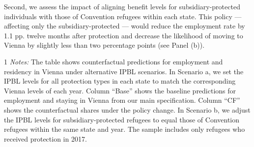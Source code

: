 Second, we assess the impact of aligning benefit levels for subsidiary-protected individuals with those of Convention refugees within each state. This policy — affecting only the subsidiary-protected — would reduce the employment rate by 1.1 pp. twelve months after protection and decrease the likelihood of moving to Vienna by slightly less than two percentage points (see Panel (b)).

\begin{table}
	\caption{Counterfactual results of various IPBL levels on employment and mobility}\label{tab:simulation}
	\begin{threeparttable}
            
		\begin{tablenotes} 
			\begin{footnotesize}
				\begin{spacing}{1}
					\textit{Notes:} The table shows counterfactual predictions for employment and residency in Vienna under alternative IPBL scenarios. In Scenario a, we set the IPBL levels for all protection types in each state to match the corresponding Vienna levels of each year. Column ``Base'' shows the baseline predictions for employment and staying in Vienna from our main specification. Column ``CF'' shows the counterfactual shares under the policy change. 
                    In Scenario b, we adjust the IPBL levels for subsidiary-protected refugees to equal those of Convention refugees within the same state and year. The sample includes only refugees who received protection in 2017.  
				\end{spacing}
			\end{footnotesize}
		\end{tablenotes}
	\end{threeparttable}
\end{table}

\FloatBarrier